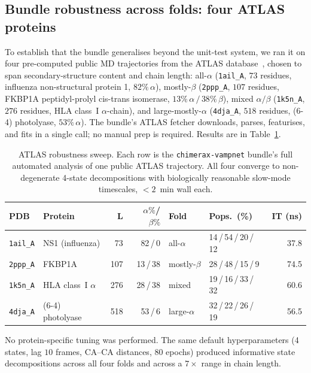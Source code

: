 \documentclass[11pt]{article}
\begin{document}
\subsection{Bundle robustness across folds: four ATLAS proteins}
\label{sec:atlas}

To establish that the bundle generalises beyond the unit-test system,
we ran it on four pre-computed public MD trajectories from the
ATLAS database~\cite{vandermeersche2024atlas}, chosen to span
secondary-structure content and chain length:
all-$\alpha$ (\texttt{1ail\_A}, $73$ residues, influenza
non-structural protein 1, $82\%\,\alpha$), mostly-$\beta$
(\texttt{2ppp\_A}, $107$ residues, FKBP1A peptidyl-prolyl cis-trans
isomerase, $13\%\,\alpha\,/\,38\%\,\beta$), mixed $\alpha/\beta$
(\texttt{1k5n\_A}, $276$ residues, HLA class~I $\alpha$-chain), and
large-mostly-$\alpha$ (\texttt{4dja\_A}, $518$ residues, (6-4)
photolyase, $53\%\,\alpha$). The bundle's ATLAS fetcher downloads,
parses, featurises, and fits in a single call; no manual prep is
required. Results are in Table~\ref{tab:atlas}.

\begin{table}[h]
\centering
\caption{ATLAS robustness sweep. Each row is the
\texttt{chimerax-vampnet} bundle's full automated analysis of one
public ATLAS trajectory. All four converge to non-degenerate 4-state
decompositions with biologically reasonable slow-mode timescales,
$<\!2$~min wall each.}
\label{tab:atlas}
\small
\begin{tabularx}{\linewidth}{l X r r l l r}
\toprule
\textbf{PDB} & \textbf{Protein} & \textbf{L} & \textbf{$\alpha\%$/$\beta\%$}
  & \textbf{Fold} & \textbf{Pops.~(\%)} & \textbf{IT (ns)} \\
\midrule
\texttt{1ail\_A} & NS1 (influenza) & 73 & 82\,/\,0 & all-$\alpha$
  & 14\,/\,54\,/\,20\,/\,12 & 37.8 \\
\texttt{2ppp\_A} & FKBP1A & 107 & 13\,/\,38 & mostly-$\beta$
  & 28\,/\,48\,/\,15\,/\,9 & 74.5 \\
\texttt{1k5n\_A} & HLA class~I $\alpha$ & 276 & 28\,/\,38 & mixed
  & 19\,/\,16\,/\,33\,/\,32 & 60.6 \\
\texttt{4dja\_A} & (6-4) photolyase & 518 & 53\,/\,6 & large-$\alpha$
  & 32\,/\,22\,/\,26\,/\,19 & 56.5 \\
\bottomrule
\end{tabularx}
\end{table}

No protein-specific tuning was performed. The same default
hyperparameters (4 states, lag $10$ frames, CA--CA distances, $80$
epochs) produced informative state decompositions across all four
folds and across a $7\!\times$ range in chain length.
\end{document}
